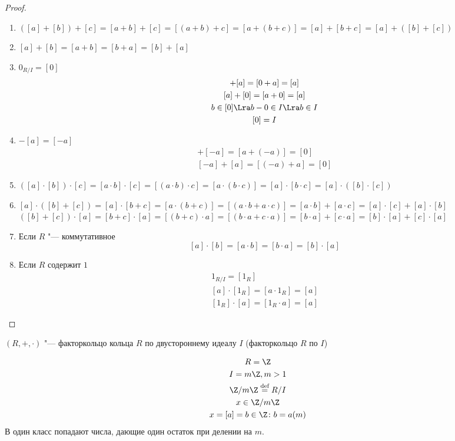 \begin{proof}
	 \begin{enumerate}
	 	\item $([a] + [b]) + [c] = [a + b] + [c] = [(a + b) + c] =
	 		[a + (b + c)] = [a] + [b + c] = [a] + ([b] + [c])$
	 	\item $[a] + [b] = [a + b] = [b + a] = [b] + [a]$
		\item $0_{R/I} = [0]$ 
			\begin{gather*}
			[0] + [a] = [0 + a] = [a] \\
	 		[a] + [0] = [a + 0] = [a] \\
	 		b \in [0] \Lra b - 0 \in I \Lra b \in I \\
	 		[0] = I
	 		\end{gather*}
	 	\item $-[a] = [-a]$
	 		\begin{gather*}
	 		[a] + [-a] = [a + (-a)] = [0] \\
	 		[-a] + [a] = [(-a) + a] = [0]
	 		\end{gather*}
	 	\item $([a] \cdot [b]) \cdot [c] = [a \cdot b] \cdot [c] =
	 		[(a \cdot b) \cdot c] = [a \cdot (b \cdot c)] =
	 		[a] \cdot [b \cdot c] = [a] \cdot ([b] \cdot [c])$
	 	\item $[a] \cdot ([b] + [c]) = [a] \cdot [b + c] = 
	 		[a \cdot (b + c)] = [(a \cdot b + a \cdot c)] = 
	 		[a \cdot b] + [a \cdot c] = [a] \cdot [c] + [a] \cdot [b]$
	 		$([b] + [c]) \cdot [a]  = [b + c] \cdot [a] = 
	 		[(b + c)  \cdot a] = [(b \cdot a + c \cdot a)] = 
	 		[b \cdot a] + [c \cdot a] = [b] \cdot [a] + [c] \cdot [a]$
	 	\item Если $R$ "--- коммутативное
	 		\[[a] \cdot [b] = [a \cdot b] = [b \cdot a] = [b] \cdot [a]\]
	 	\item Если $R$ содержит $1$
	 		\begin{gather*}
	 		1_{R/I} = [1_R] \\
			[a] \cdot [1_R] = [a \cdot 1_R] = [a] \\
	 		[1_R] \cdot [a] = [1_R \cdot a] = [a]
	 		\end{gather*}
	\end{enumerate}
\end{proof}
	 
\begin{Def}
	$(R, +, \cdot)$ "--- факторкольцо кольца $R$ по двустороннему идеалу $I$ (факторкольцо $R$ по $I$)
\end{Def}	 

\begin{exmp}
	\begin{gather*}
		R = \Z \\
		I = m \Z, m > 1 \\
		\Z /m \Z \overset{\text{def}}{=} R/I \\
		x \in \Z/m\Z \\
		x = [a] = {b \in \Z \colon b = a (m)}
	\end{gather*}
	В один класс попадают числа, дающие один остаток при делении на $m$.	 
\end{exmp}
	 
